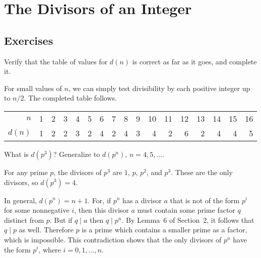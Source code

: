 \chapter{The Divisors of an Integer}

\section{Exercises}

 Verify that the table of values for $d(n)$ is correct as
far as it goes, and complete it.
\begin{solution}
  For small values of $n$, we can simply test divisibility by each
  positive integer up to $n/2$. The completed table follows.
  \begin{center}
    \begin{tabular}{r|rrrrrrrrrrrrrrrr}
      $n$ & 1 & 2 & 3 & 4 & 5 & 6 & 7 & 8 & 9 & 10
      & 11 & 12 & 13 & 14 & 15 & 16 \\
      $d(n)$ & 1 & 2 & 2 & 3 & 2 & 4 & 2 & 4 & 3 & 4
      & 2 & 6 & 2 & 4 & 4 & 5
    \end{tabular}
  \end{center}
\end{solution}

 What is $d(p^3)$? Generalize to $d(p^n)$,
$n = 4, 5, \dots$.
\begin{solution}
  For any prime $p$, the divisors of $p^3$ are $1$, $p$, $p^2$, and
  $p^3$. These are the only divisors, so $d(p^3) = 4$.

  In general, $d(p^n) = n + 1$. For, if $p^n$ has a divisor $a$ that
  is not of the form $p^i$ for some nonnegative $i$, then this divisor
  $a$ must contain some prime factor $q$ distinct from $p$. But if
  $q\mid a$ then $q\mid p^n$. By Lemma~6 of Section~2, it follows that
  $q\mid p$ as well. Therefore $p$ is a prime which contains a smaller
  prime as a factor, which is impossible. This contradiction shows
  that the only divisors of $p^n$ have the form $p^i$, where
  $i = 0, 1, \dots, n$.
\end{solution}
